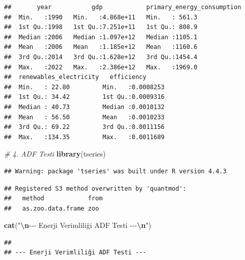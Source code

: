 \documentclass[
]{article}
\newenvironment{Shaded}{\begin{snugshade}}{\end{snugshade}}
\newcommand{\AttributeTok}[1]{\textcolor[rgb]{0.13,0.29,0.53}{#1}}
\newcommand{\CommentTok}[1]{\textcolor[rgb]{0.56,0.35,0.01}{\textit{#1}}}
\newcommand{\FunctionTok}[1]{\textcolor[rgb]{0.13,0.29,0.53}{\textbf{#1}}}
\newcommand{\NormalTok}[1]{#1}
\newcommand{\OtherTok}[1]{\textcolor[rgb]{0.56,0.35,0.01}{#1}}
\newcommand{\SpecialCharTok}[1]{\textcolor[rgb]{0.81,0.36,0.00}{\textbf{#1}}}
\newcommand{\StringTok}[1]{\textcolor[rgb]{0.31,0.60,0.02}{#1}}
\begin{document}
\begin{verbatim}
##       year           gdp            primary_energy_consumption
##  Min.   :1990   Min.   :4.868e+11   Min.   : 561.3            
##  1st Qu.:1998   1st Qu.:7.251e+11   1st Qu.: 808.9            
##  Median :2006   Median :1.097e+12   Median :1105.1            
##  Mean   :2006   Mean   :1.185e+12   Mean   :1160.6            
##  3rd Qu.:2014   3rd Qu.:1.628e+12   3rd Qu.:1454.4            
##  Max.   :2022   Max.   :2.386e+12   Max.   :1969.0            
##  renewables_electricity   efficiency       
##  Min.   : 22.80         Min.   :0.0008253  
##  1st Qu.: 34.42         1st Qu.:0.0009316  
##  Median : 40.73         Median :0.0010132  
##  Mean   : 56.50         Mean   :0.0010233  
##  3rd Qu.: 69.22         3rd Qu.:0.0011156  
##  Max.   :134.35         Max.   :0.0011689
\end{verbatim}

\begin{Shaded}
\begin{Highlighting}[]
\CommentTok{\# 4. ADF Testi}
\FunctionTok{library}\NormalTok{(tseries)}
\end{Highlighting}
\end{Shaded}

\begin{verbatim}
## Warning: package 'tseries' was built under R version 4.4.3
\end{verbatim}

\begin{verbatim}
## Registered S3 method overwritten by 'quantmod':
##   method            from
##   as.zoo.data.frame zoo
\end{verbatim}

\begin{Shaded}
\begin{Highlighting}[]
\FunctionTok{cat}\NormalTok{(}\StringTok{"}\SpecialCharTok{\textbackslash{}n}\StringTok{{-}{-}{-} Enerji Verimliliği ADF Testi {-}{-}{-}}\SpecialCharTok{\textbackslash{}n}\StringTok{"}\NormalTok{)}
\end{Highlighting}
\end{Shaded}

\begin{verbatim}
## 
## --- Enerji Verimliliği ADF Testi ---
\end{verbatim}

\begin{Shaded}
\end{Shaded}
\end{document}
